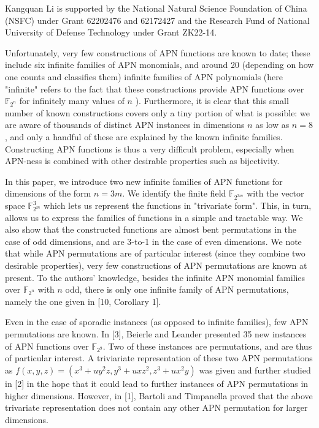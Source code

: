 \documentclass[10pt]{article}
\begin{document}
Kangquan Li is supported by the National Natural Science Foundation of China (NSFC) under Grant 62202476 and 62172427 and the Research Fund of National University of Defense Technology under Grant ZK22-14.

Unfortunately, very few constructions of APN functions are known to date; these include six infinite families of APN monomials, and around 20 (depending on how one counts and classifies them) infinite families of APN polynomials (here "infinite" refers to the fact that these constructions provide APN functions over $\mathbb{F}_{2^{n}}$ for infinitely many values of $n$ ). Furthermore, it is clear that this small number of known constructions covers only a tiny portion of what is possible: we are aware of thousands of distinct APN instances in dimensions $n$ as low as $n=8$, and only a handful of these are explained by the known infinite families. Constructing APN functions is thus a very difficult problem, especially when APN-ness is combined with other desirable properties such as bijectivity.

In this paper, we introduce two new infinite families of APN functions for dimensions of the form $n=3 m$. We identify the finite field $\mathbb{F}_{2^{3 m}}$ with the vector space $\mathbb{F}_{2^{m}}^{3}$ which lets us represent the functions in "trivariate form". This, in turn, allows us to express the families of functions in a simple and tractable way. We also show that the constructed functions are almost bent permutations in the case of odd dimensions, and are 3-to-1 in the case of even dimensions. We note that while APN permutations are of particular interest (since they combine two desirable properties), very few constructions of APN permutations are known at present. To the authors' knowledge, besides the infinite APN monomial families over $\mathbb{F}_{2^{n}}$ with $n$ odd, there is only one infinite family of APN permutations, namely the one given in [10, Corollary 1].

Even in the case of sporadic instances (as opposed to infinite families), few APN permutations are known. In [3], Beierle and Leander presented 35 new instances of APN functions over $\mathbb{F}_{2^{9}}$. Two of these instances are permutations, and are thus of particular interest. A triviariate representation of these two APN permutations as $f(x, y, z)=\left(x^{3}+u y^{2} z, y^{3}+u x z^{2}, z^{3}+u x^{2} y\right)$ was given and further studied in [2] in the hope that it could lead to further instances of APN permutations in higher dimensions. However, in [1], Bartoli and Timpanella proved that the above trivariate representation does not contain any other APN permutation for larger dimensions.
\end{document}
